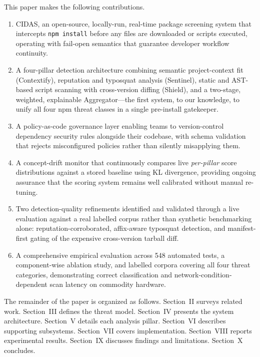 \documentclass[journal]{IEEEtran}
\begin{document}
This paper makes the following contributions.

\begin{enumerate}
\item CIDAS, an open-source, locally-run, real-time package screening system that intercepts
\texttt{npm install} before any files are downloaded or scripts executed, operating with fail-open
semantics that guarantee developer workflow continuity.

\item A four-pillar detection architecture combining semantic project-context fit (Contextify), reputation
and typosquat analysis (Sentinel), static and AST-based script scanning with cross-version diffing (Shield),
and a two-stage, weighted, explainable Aggregator---the first system, to our knowledge, to unify all four
npm threat classes in a single pre-install gatekeeper.

\item A policy-as-code governance layer enabling teams to version-control dependency security rules
alongside their codebase, with schema validation that rejects misconfigured policies rather than silently
misapplying them.

\item A concept-drift monitor that continuously compares live \emph{per-pillar} score distributions against a
stored baseline using KL divergence, providing ongoing assurance that the scoring system remains well
calibrated without manual re-tuning.

\item Two detection-quality refinements identified and validated through a live evaluation against a real
labelled corpus rather than synthetic benchmarking alone: reputation-corroborated, affix-aware typosquat
detection, and manifest-first gating of the expensive cross-version tarball diff.

\item A comprehensive empirical evaluation across 548 automated tests, a component-wise ablation study, and
labelled corpora covering all four threat categories, demonstrating correct classification and
network-condition-dependent scan latency on commodity hardware.
\end{enumerate}

The remainder of the paper is organized as follows. Section~II surveys related work. Section~III defines the
threat model. Section~IV presents the system architecture. Section~V details each analysis pillar. Section~VI
describes supporting subsystems. Section~VII covers implementation. Section~VIII reports experimental
results. Section~IX discusses findings and limitations. Section~X concludes.
\end{document}
